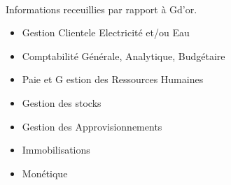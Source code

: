 \paragraph{}
  Informations receuillies par rapport \`a Gd'or.
  
  \begin{itemize}
    \item Gestion Clientele Electricit\'e et/ou Eau
    \item Comptabilit\'e G\'en\'erale, Analytique, Budg\'etaire
    \item Paie et G
    estion des Ressources Humaines
    \item Gestion des stocks
    \item Gestion des Approvisionnements
    \item Immobilisations
    \item Mon\'etique
  \end{itemize}